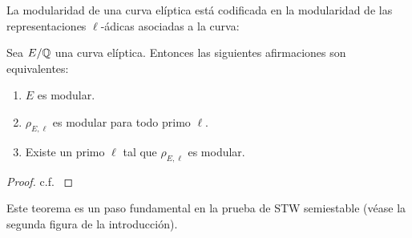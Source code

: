La modularidad de una curva el\'iptica est\'a codificada en la modularidad de las representaciones $\ell$-\'adicas asociadas a la curva:

\begin{thm}\label{thm:equivmodular}
  Sea $E/\mathbb{Q}$ una curva el\'iptica. Entonces las siguientes afirmaciones son equivalentes:
  \begin{enumerate}
  \item $E$ es modular.
  \item $\rho_{E,\ell}$ es modular para todo primo $\ell$.
  \item Existe un primo $\ell$ tal que $\rho_{E,\ell}$ es modular.
  \end{enumerate}
\end{thm}

\begin{proof}
  c.f. \cite[\S3.4, proposici\'on 3.23]{SaitoFLTBT}
\end{proof}

Este teorema es un paso fundamental en la prueba de STW semiestable (v\'ease la segunda figura de la introducci\'on).